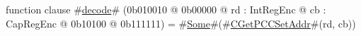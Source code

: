 function clause #\hyperref[zdecode]{decode}# (0b010010 @ 0b00000 @ rd : IntRegEnc @ cb : CapRegEnc @   0b10100 @ 0b111111) = #\hyperref[zSome]{Some}#(#\hyperref[zCGetPCCSetAddr]{CGetPCCSetAddr}#(rd, cb))
